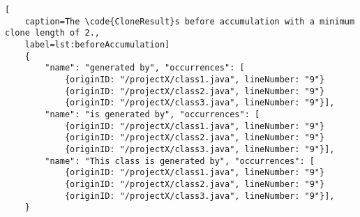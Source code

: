 
\begin{lstlisting}[
	caption=The \code{CloneResult}s before accumulation with a minimum clone length of 2.,
	label=lst:beforeAccumulation]
	{		
		"name": "generated by", "occurrences": [
			{originID: "/projectX/class1.java", lineNumber: "9"}
			{originID: "/projectX/class2.java", lineNumber: "9"}
			{originID: "/projectX/class3.java", lineNumber: "9"}],
		"name": "is generated by", "occurrences": [
			{originID: "/projectX/class1.java", lineNumber: "9"}
			{originID: "/projectX/class2.java", lineNumber: "9"}
			{originID: "/projectX/class3.java", lineNumber: "9"}],
		"name": "This class is generated by", "occurrences": [
			{originID: "/projectX/class1.java", lineNumber: "9"}
			{originID: "/projectX/class2.java", lineNumber: "9"}
			{originID: "/projectX/class3.java", lineNumber: "9"}],
	}
\end{lstlisting}
